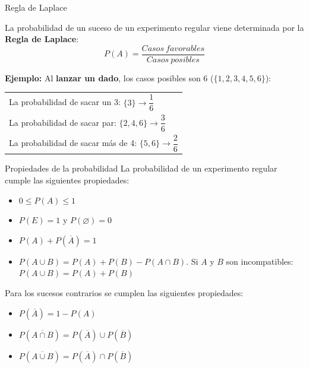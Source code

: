 \documentclass[11pt,handout]{beamer}
\begin{document}
\begin{frame}{Regla de Laplace}
\begin{block}{}
 La probabilidad de un suceso de un experimento regular viene determinada por la \textbf{Regla de Laplace}:
$$P(A)=\dfrac{Casos\ favorables}{Casos\ posibles} $$
\end{block}

\pause

\textbf{Ejemplo:} Al \textbf{lanzar un dado}, los casos posibles son 6 ($\lbrace1,2,3,4,5,6\rbrace$):\\
\begin{tabular}{l}
La probabilidad de sacar un 3: $\lbrace3\rbrace\to \dfrac{1}{6}$\\
La probabilidad de sacar par: $\lbrace2,4,6\rbrace\to\dfrac{3}{6}$ \\
La probabilidad de sacar más de 4: $\lbrace5,6\rbrace\to\dfrac{2}{6}$
\end{tabular}

\end{frame}

\begin{frame}{Propiedades de la probabilidad} La probabilidad de un experimento regular cumple las siguientes propiedades:
\begin{block}{}
    \begin{itemize}[<+->]
        \item $0 \leq P(A) \leq 1$ 
        \item $P(E) = 1$ y $P(\varnothing) = 0$
        \item $P(A) + P(\overline A) = 1$
        \item $P(A \cup B) = P(A) + P(B) - P(A \cap B)$. Si $A$ y $B$ son incompatibles: $P(A \cup B) = P(A) + P(B)$
    \end{itemize}

\end{block}

Para los sucesos contrarios se cumplen las siguientes propiedades:

\begin{itemize}
\item $P(\overline{A})=1-P(A)$
\item $P(\overline{A \cap B})=P(\overline{A})\cup P(\overline{B})$
\item $P(\overline{A \cup B})=P(\overline{A})\cap P(\overline{B})$
\end{itemize}

\end{frame}
\end{document}
